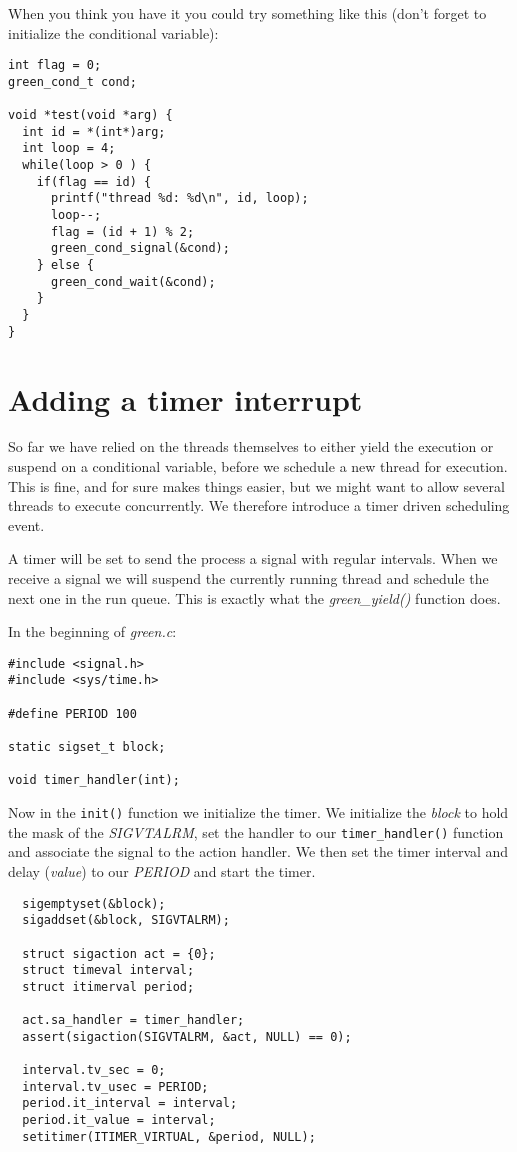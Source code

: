 \documentclass[a4paper,11pt]{article}
\begin{document}
When you think you have it you could try something like this (don't
forget to initialize the conditional variable):

\begin{lstlisting}
int flag = 0;
green_cond_t cond;

void *test(void *arg) {
  int id = *(int*)arg;
  int loop = 4;
  while(loop > 0 ) {
    if(flag == id) {
      printf("thread %d: %d\n", id, loop);
      loop--;
      flag = (id + 1) % 2;
      green_cond_signal(&cond);    
    } else {
      green_cond_wait(&cond);
    }
  }
}
\end{lstlisting}

\section{Adding a timer interrupt}

So far we have relied on the threads themselves to either yield the
execution or suspend on a conditional variable, before we schedule a
new thread for execution. This is fine, and for sure makes things
easier, but we might want to allow several threads to execute
concurrently. We therefore introduce a timer driven scheduling event.

A timer will be set to send the process a signal with regular
intervals. When we receive a signal we will suspend the currently
running thread and schedule the next one in the run queue. This is
exactly what the {\em green\_yield()} function does.

In the beginning of {\em green.c}:

\begin{lstlisting}
#include <signal.h>
#include <sys/time.h>
  
#define PERIOD 100

static sigset_t block;

void timer_handler(int); 
\end{lstlisting}


Now in the {\tt init()} function we initialize the timer. We
initialize the {\em block} to hold the mask of the {\em SIGVTALRM},
set the handler to our {\tt timer\_handler()} function and associate the
signal to the action handler. We then set the timer interval and delay
({\em value}) to our {\em PERIOD} and start the timer. 

\begin{lstlisting}
  sigemptyset(&block);
  sigaddset(&block, SIGVTALRM);
  
  struct sigaction act = {0};
  struct timeval interval;
  struct itimerval period;

  act.sa_handler = timer_handler;   
  assert(sigaction(SIGVTALRM, &act, NULL) == 0);    

  interval.tv_sec = 0;
  interval.tv_usec = PERIOD;
  period.it_interval = interval;
  period.it_value = interval;
  setitimer(ITIMER_VIRTUAL, &period, NULL);
\end{lstlisting}
\end{document}
